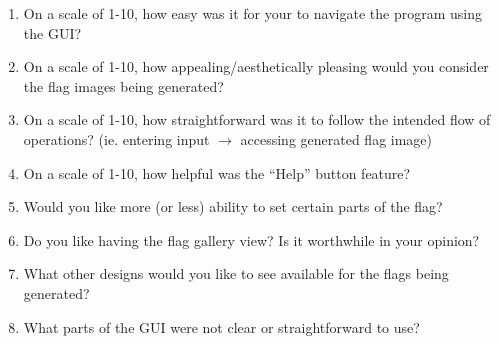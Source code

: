 \documentclass[12pt, titlepage]{article}
\begin{document}
\begin{enumerate}
    \item On a scale of 1-10, how easy was it for your to navigate the program
    using the GUI?
    \item On a scale of 1-10, how appealing/aesthetically pleasing would you
    consider the flag images being generated?
    \item On a scale of 1-10, how straightforward was it to follow the
    intended flow of operations? (ie. entering input $\rightarrow$ accessing generated
    flag image)
    \item On a scale of 1-10, how helpful was the ``Help'' button feature?
    \item Would you like more (or less) ability to set certain parts of the
    flag?
    \item Do you like having the flag gallery view? Is it worthwhile in your
    opinion?
    \item What other designs would you like to see available for the flags
    being generated?
    \item What parts of the GUI were not clear or straightforward to use?
\end{enumerate}
\end{document}

